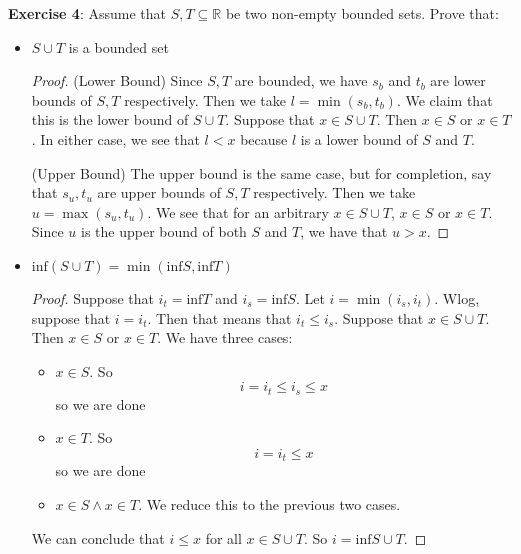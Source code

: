 \documentclass{article}
\begin{document}
\textbf{Exercise 4}: Assume that $S, T \subseteq \mathbb{R}$ be two non-empty bounded sets. Prove that:
    \begin{itemize}
        \item $S \cup T$ is a bounded set
            \begin{proof}
                (Lower Bound) Since $S, T$ are bounded, we have $s_{b}$ and $t_{b}$ are lower bounds of $S, T$ respectively. Then we take $l = \min(s_{b}, t_{b})$. We claim that this is the lower bound of $S \cup T$. Suppose that $x \in S \cup T$. Then $x \in S$ or $x \in T$. In either case, we see that $l < x$ because $l$ is a lower bound of $S$ and $T$.

                (Upper Bound) The upper bound is the same case, but for completion, say that $s_{u}, t_{u}$ are upper bounds of $S, T$ respectively. Then we take $u = \max(s_{u}, t_{u})$. We see that for an arbitrary $x \in S \cup T$, $x \in S$ or $x \in T$. Since $u$ is the upper bound of both $S$ and $T$, we have that $u > x$.
           \end{proof}

        \item $\text{inf}(S \cup T) = \min(\text{inf}S, \text{inf}T)$ 
            \begin{proof}
                Suppose that $i_{t} = \text{inf}T$ and $i_{s} = \text{inf}S$. Let $i = \min(i_{s}, i_{t})$. Wlog, suppose that $i = i_{t}$. Then that means that $i_{t} \leq i_{s}$. Suppose that $x \in S \cup T$. Then $x \in S$ or $x \in T$. We have three cases:
                    \begin{itemize}
                        \item $x \in S$. So
                            \begin{equation*}
                                i = i_{t} \leq i_{s} \leq x
                            \end{equation*}
                        so we are done

                        \item $x \in T$. So 
                            \begin{equation*}
                                i = i_{t} \leq x
                            \end{equation*}
                        so we are done

                        \item $x \in S \land x \in T$. We reduce this to the previous two cases. 
                    \end{itemize}
                We can conclude that $i \leq x$ for all $x \in S \cup T$. So $i = \text{inf} S \cup T$.
            \end{proof}
    \end{itemize}
\end{document}
